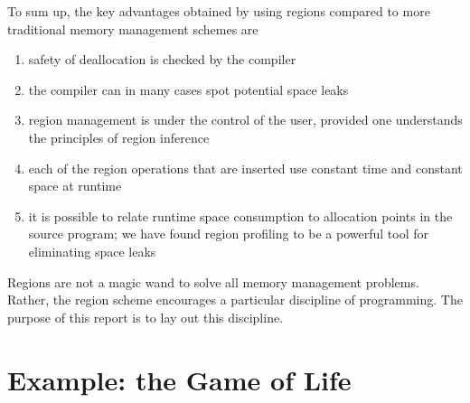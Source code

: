\documentclass[12pt]{book}
\begin{document}
To sum up, the key advantages obtained by using regions compared to more
traditional memory management schemes are
\begin{enumerate}
\item safety of deallocation is checked by the compiler
\item the compiler can in many cases spot potential space leaks
\item region management is under the control of the user, provided one
  understands the principles of region inference
\item each of the region operations that are inserted use constant time and
  constant space at runtime
\item it is possible to relate runtime space consumption to allocation points in
  the source program; we have found region profiling to be a powerful tool for
  eliminating space leaks
\end{enumerate}
Regions are not a magic wand to solve all memory management problems.  Rather,
the region scheme encourages a particular discipline of programming. The purpose
of this report is to lay out this discipline.

\section{Example: the Game of Life}
\label{life.sec}
\end{document}
